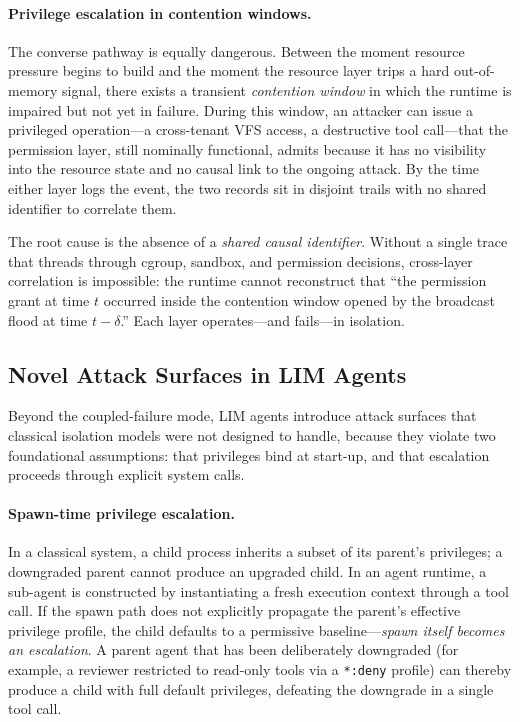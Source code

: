 \paragraph{Privilege escalation in contention windows.}
The converse pathway is equally dangerous. Between the moment resource
pressure begins to build and the moment the resource layer trips a hard
out-of-memory signal, there exists a transient \emph{contention window} in
which the runtime is impaired but not yet in failure. During this window, an
attacker can issue a privileged operation---a cross-tenant VFS access, a
destructive tool call---that the permission layer, still nominally functional,
admits because it has no visibility into the resource state and no causal link
to the ongoing attack. By the time either layer logs the event, the two
records sit in disjoint trails with no shared identifier to correlate them.

The root cause is the absence of a \emph{shared causal identifier}.
Without a single trace that threads through cgroup, sandbox, and permission
decisions, cross-layer correlation is impossible: the runtime cannot reconstruct
that ``the permission grant at time $t$ occurred inside the contention window
opened by the broadcast flood at time $t-\delta$.'' Each layer operates---and fails---in isolation.

\subsection{Novel Attack Surfaces in LIM Agents}
\label{sec:bg-attack}

Beyond the coupled-failure mode, LIM agents introduce attack surfaces that
classical isolation models were not designed to handle, because they violate
two foundational assumptions: that privileges bind at start-up, and that
escalation proceeds through explicit system calls.

\paragraph{Spawn-time privilege escalation.}
In a classical system, a child process inherits a subset of its parent's
privileges; a downgraded parent cannot produce an upgraded child. In an agent
runtime, a sub-agent is constructed by instantiating a fresh execution context
through a tool call. If the spawn path does not explicitly propagate the
parent's effective privilege profile, the child defaults to a permissive
baseline---\emph{spawn itself becomes an escalation}. A parent agent that has
been deliberately downgraded (for example, a reviewer restricted to read-only
tools via a \texttt{*:deny} profile) can thereby produce a child with full
default privileges, defeating the downgrade in a single tool call.

